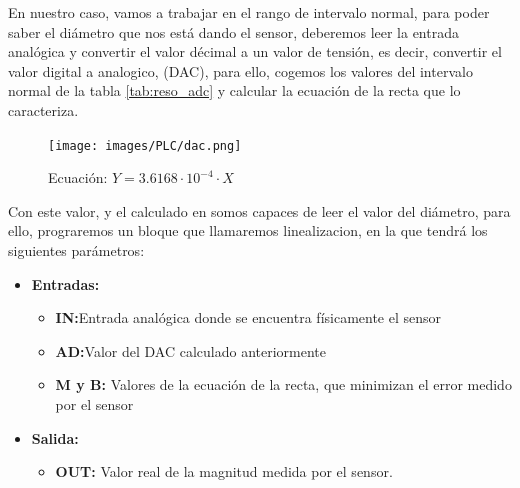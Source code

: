 En nuestro caso, vamos a trabajar en el rango de intervalo normal, para poder saber el diámetro que nos está dando el sensor, deberemos leer la entrada analógica y convertir el valor décimal a un valor de tensión, es decir, convertir el valor digital a analogico, (DAC), para ello, cogemos los valores del intervalo normal de la tabla \ref{tab:reso_adc} y calcular la ecuación de la recta que lo caracteriza.

    \begin{figure}[H]
            \centering
            \texttt{[image: images/PLC/dac.png]}
            \caption{Ecuación: $Y=3.6168 \cdot 10^{-4} \cdot X$}
            \label{fig:plc_DAC}
    \end{figure}

Con este valor, y el calculado en \pageref{fig:sens_regre} somos capaces de leer el valor del diámetro, para ello, prograremos un bloque que llamaremos linealizacion, en la que tendrá los siguientes parámetros:

\begin{itemize}
    \item{\textbf{Entradas:}}
        \begin{itemize}
            \item{\textbf{IN:}Entrada analógica donde se encuentra físicamente el sensor}
            \item{\textbf{AD:}Valor del DAC calculado anteriormente}
            \item{\textbf{M y B:} Valores de la ecuación de la recta, que minimizan el error medido por el sensor}         
        \end{itemize}
    \item{\textbf{Salida:}}
        \begin{itemize}
            \item{\textbf{OUT:} Valor real de la magnitud medida por el sensor.}
        \end{itemize}
\end{itemize}